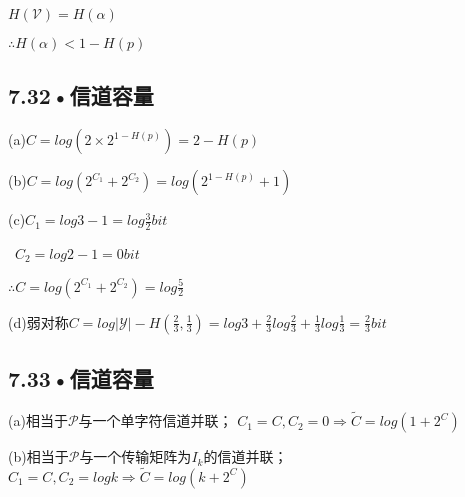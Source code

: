 \documentclass[UTF8]{ctexart}
\begin{document}
$H (\mathcal{V} )=H(\alpha)$

$\therefore H(\alpha)< 1-H(p)$

\subsection*{7.32•信道容量}
(a)$C = log(2\times 2^{1-H(p)})=2-H(p)$

(b)$C = log(2^{C_1}+2^{C_2})=log(2^{1-H(p)}+1)$

(c)$C_1 = log3 - 1 =log\frac{3}{2}bit$

\quad \ $C_2 = log2 - 1 = 0bit$

\quad $\therefore C = log(2^{C_1}+2^{C_2})=log\frac{5}{2}$

(d)弱对称$C = log|\mathcal{Y}|-H(\frac{2}{3},\frac{1}{3})= log3 +\frac{2}{3}log\frac{2}{3}+\frac{1}{3}log\frac{1}{3}=\frac{2}{3}bit$

\subsection*{7.33•信道容量}
(a)相当于$\mathcal{P}$与一个单字符信道并联；
$C_1 = C , C_2 = 0 \Rightarrow\tilde{C} = log(1+2^C) $

(b)相当于$\mathcal{P}$与一个传输矩阵为$I_k$的信道并联；$C_1 = C , C_2 = logk \Rightarrow\tilde{C} = log(k+2^C) $
\end{document}
